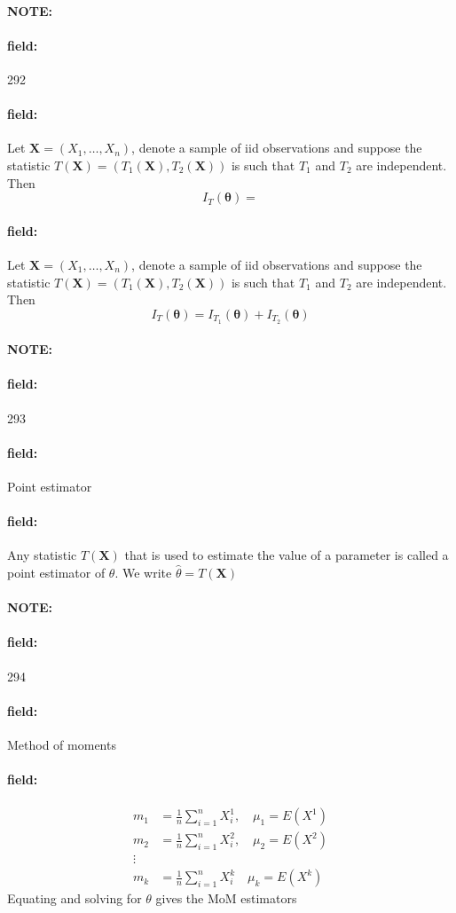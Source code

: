 \documentclass[12pt]{article}
\newenvironment{note}{\paragraph{NOTE:}}{}
\newenvironment{field}{\paragraph{field:}}{}
\begin{document}
\begin{note} \begin{field} \tiny 292 \end{field}
  \begin{field}
    Let $\mathbf{X} = (X_1, \ldots , X_n)$, denote a sample of iid observations and suppose the statistic $T(\mathbf{X}) = (T_1(\mathbf{X}), T_2(\mathbf{X}))$ is such that $T_1$ and $T_2$ are independent. Then $$ I_{T}(\boldsymbol\theta) = $$
  \end{field}
  \begin{field}
    Let $\mathbf{X} = (X_1, \ldots , X_n)$, denote a sample of iid observations and suppose the statistic $T(\mathbf{X}) = (T_1(\mathbf{X}), T_2(\mathbf{X}))$ is such that $T_1$ and $T_2$ are independent. Then $$ I_{T}(\boldsymbol\theta) = I_{T_1}(\boldsymbol\theta) + I_{T_2}(\boldsymbol\theta)$$
  \end{field}
\end{note}

\begin{note} \begin{field} \tiny 293 \end{field}
  \begin{field}
    Point estimator
  \end{field}
  \begin{field}
    Any statistic $T(\mathbf{X})$ that is used to estimate the value of a parameter is called a point estimator of $\theta$. We write $\hat{\theta} = T(\mathbf{X})$
  \end{field}
\end{note}

\begin{note} \begin{field} \tiny 294 \end{field}
  \begin{field}
    Method of moments
  \end{field}
  \begin{field}
    \begin{align*}
      m_1 &= \frac{1}{n}\sum _{i = 1}^n X_i^1, \quad \mu_1 = E(X^1)\\
      m_2 &= \frac{1}{n}\sum _{i = 1}^n X_i^2, \quad \mu_2 = E(X^2)\\
      \vdots & \\
      m_k &= \frac{1}{n} \sum _{i = 1}^n X_i^k \quad \mu_k = E(X^k)
    \end{align*}
    Equating and solving for $\theta$ gives the MoM estimators
  \end{field}
\end{note}
\end{document}
